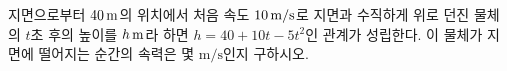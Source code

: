 지면으로부터 $40\mkern3mu \mathrm{m}$의 위치에서 처음 속도 $10\mkern3mu \mathrm{m/s}$로 지면과 수직하게 위로 던진 물체의 $t$초 후의 높이를 $h\mkern3mu \mathrm{m}$라 하면 $h=40+10t-5t^2$인 관계가 성립한다. 이 물체가 지면에 떨어지는 순간의 속력은 몇 $\mathrm{m/s}$인지 구하시오.
